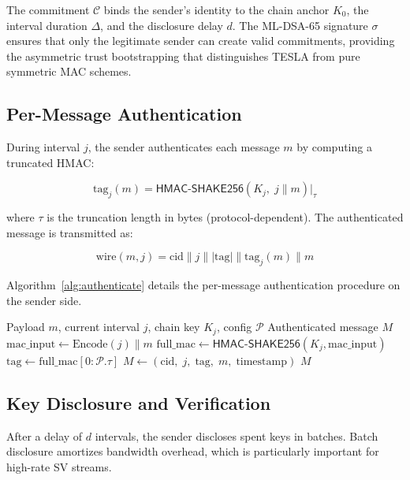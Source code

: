 \documentclass[conference,10pt]{IEEEtran}
\newcommand{\SHAKE}{\textsf{SHAKE256}}
\newcommand{\HMAC}{\textsf{HMAC}}
\newcommand{\SV}{\textsf{SV}}
\begin{document}
The commitment $\mathcal{C}$ binds the sender's identity to the chain anchor $K_0$, the interval duration $\Delta$, and the disclosure delay $d$. The ML-DSA-65 signature $\sigma$ ensures that only the legitimate sender can create valid commitments, providing the asymmetric trust bootstrapping that distinguishes TESLA from pure symmetric MAC schemes.

\subsection{Per-Message Authentication}

During interval $j$, the sender authenticates each message $m$ by computing a truncated HMAC:

\begin{equation}
  \text{tag}_j(m) = \HMAC\text{-}\SHAKE{}(K_j,\; j \| m)\big|_{\tau}
\label{eq:mac}
\end{equation}

\noindent where $\tau$ is the truncation length in bytes (protocol-dependent). The authenticated message is transmitted as:

\begin{equation}
  \text{wire}(m, j) = \text{cid} \| j \| |\text{tag}| \| \text{tag}_j(m) \| m
\end{equation}

Algorithm~\ref{alg:authenticate} details the per-message authentication procedure on the sender side.

\begin{algorithm}[t]
\caption{TESLA++ Message Authentication (Sender)}
\label{alg:authenticate}
\begin{algorithmic}[1]
\REQUIRE Payload $m$, current interval $j$, chain key $K_j$, config $\mathcal{P}$
\ENSURE Authenticated message $M$
\STATE $\text{mac\_input} \gets \text{Encode}(j) \| m$
\STATE $\text{full\_mac} \gets \HMAC\text{-}\SHAKE{}(K_j, \text{mac\_input})$
\STATE $\text{tag} \gets \text{full\_mac}[0:\mathcal{P}.\tau]$ 
\STATE $M \gets (\text{cid},\; j,\; \text{tag},\; m,\; \text{timestamp})$
\RETURN $M$
\end{algorithmic}
\end{algorithm}

\subsection{Key Disclosure and Verification}

After a delay of $d$ intervals, the sender discloses spent keys in batches. Batch disclosure amortizes bandwidth overhead, which is particularly important for high-rate \SV{} streams.
\end{document}
